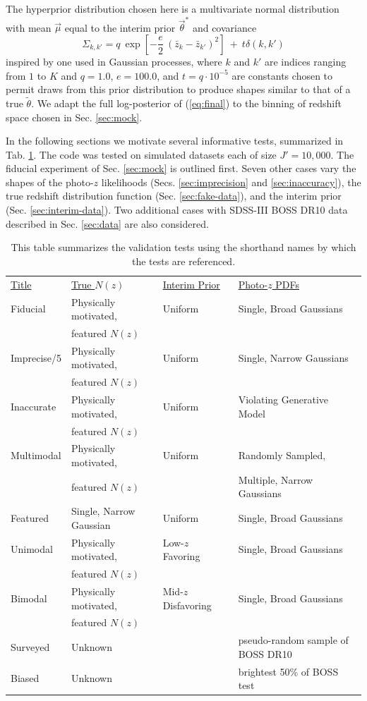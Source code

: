 \documentclass[preprint]{aastex}
\newcommand{\textul}{\underline}
\begin{document}
The hyperprior distribution chosen here is a multivariate normal distribution 
with mean $\vec{\mu}$ equal to the interim prior $\vec{\theta}^{*}$ and 
covariance
\begin{equation}
\label{eq:priorcov}
\Sigma_{k,k'} = q\ \exp[-\frac{e}{2}\ (\bar{z}_{k}-\bar{z}_{k'})^{2}]\ +\ 
t\delta(k,k')
\end{equation}
inspired by one used in Gaussian processes, where $k$ and $k'$ are indices 
ranging from $1$ to $K$ and $q=1.0$, $e=100.0$, and $t=q\cdot10^{-5}$ are 
constants chosen to permit draws from this prior distribution to produce shapes 
similar to that of a true $\tilde{\theta}$.  We adapt the full log-posterior of 
(\ref{eq:final}) to the binning of redshift space chosen in Sec. \ref{sec:mock}.

In the following sections we motivate several informative tests, summarized in 
Tab. \ref{tab:key}.  The code was tested on simulated datasets each of size 
$J'=10,000$.  The fiducial experiment of Sec. \ref{sec:mock} is outlined first. 
 Seven other cases vary the shapes of the photo-$z$ likelihoods (Secs. 
\ref{sec:imprecision} and \ref{sec:inaccuracy}), the true redshift distribution 
function (Sec. \ref{sec:fake-data}), and the interim prior (Sec. 
\ref{sec:interim-data}).  Two additional cases with SDSS-III BOSS DR10 data 
described in Sec. \ref{sec:data} are also considered.

\begin{table}
\begin{tabular}{llll}
\textul{Title} & \textul{True $N(z)$} & \textul{Interim Prior} & 
\textul{Photo-$z$ PDFs}\\
Fiducial & Physically motivated, & Uniform & Single, Broad Gaussians\\
& featured $N(z)$ &&\\
Imprecise/5 & Physically motivated, & Uniform & Single, Narrow Gaussians\\
& featured $N(z)$ &&\\
Inaccurate & Physically motivated, & Uniform & Violating Generative Model\\
& featured $N(z)$ &&\\
Multimodal & Physically motivated, & Uniform & Randomly Sampled,\\
& featured $N(z)$ && Multiple, Narrow Gaussians\\
Featured & Single, Narrow Gaussian & Uniform & Single, Broad Gaussians\\
Unimodal & Physically motivated, & Low-$z$ Favoring & Single, Broad Gaussians\\
& featured $N(z)$ &&\\
Bimodal & Physically motivated, & Mid-$z$ Disfavoring & Single, Broad 
Gaussians\\
& featured $N(z)$ &&\\
Surveyed & Unknown & \citet{Sheldon2012} & pseudo-random sample of BOSS DR10\\
Biased & Unknown & \citet{Sheldon2012} & brightest 50\% of BOSS test
\end{tabular}
\caption{This table summarizes the validation tests using the shorthand names 
by which the tests are referenced.}
\label{tab:key}
\end{table}
\end{document}

